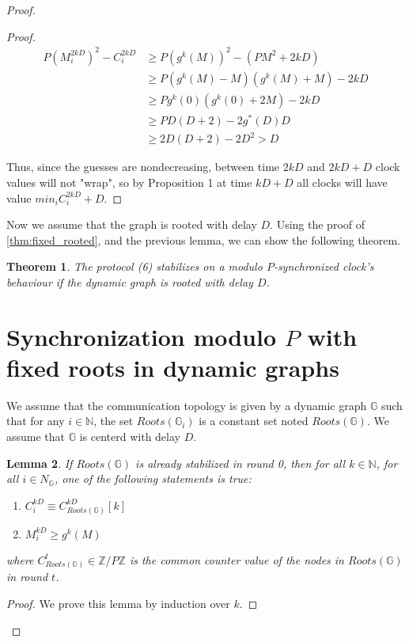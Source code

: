 \documentclass[11pt,letterpaper]{article}
\newtheorem{thm}{Theorem}
\newtheorem{lem}[thm]{Lemma}
\begin{document}
\begin{proof}
\begin{proof}
	\begin{align*}
		P(M_i^{2kD})^2 - C_i^{2kD} & \geq P(g^k(M))^2-(PM^2+2kD) \\
		& \geq P(g^k(M)-M)(g^k(M)+M)-2kD \\
		& \geq Pg^k(0)(g^k(0)+2M)-2kD \\
		& \geq PD(D+2)-2g^*(D)D \\
		& \geq 2D(D+2)-2D^2 > D
	\end{align*}

	Thus, since the guesses are nondecreasing, between time $2kD$
	and $2kD + D$ clock values will not "wrap", so by Proposition 1
	at time $kD + D$ all clocks will have value $min_i C_i^{2kD}+D$.
\end{proof}

Now we assume that the graph is rooted with delay $D$.
Using the proof of \ref{thm:fixed_rooted}, and the previous lemma, we can show the following theorem.

\begin{thm}
	The protocol (6) stabilizes on a modulo $P$-synchronized clock's behaviour if the dynamic graph is rooted with delay $D$.
\end{thm}

\section{Synchronization modulo $P$ with fixed roots in dynamic graphs}

We assume that the communication topology is given by a dynamic graph $\mathds{G}$
such that for any $i \in \mathds{N}$, the set $Roots(\mathds{G}_i)$ is a constant set noted $Roots(\mathds{G})$.
We assume that $\mathds{G}$ is centerd with delay $D$.

\begin{lem}
	If $Roots(\mathds{G})$ is already stabilized in round 0, then
	for all $k \in \mathds{N}$, for all $i \in N_\mathds{G}$,
	one of the following statements is true:
	\begin{enumerate}
		\item $C_i^{kD} \equiv C_{Roots(\mathds{G})}^{kD} [k]$
		\item $M_i^{kD} \geq g^{k}(M)$
	\end{enumerate}
	where $C_{Roots(\mathds{G})}^t \in \mathds{Z}/P\mathds{Z}$ is the common counter value of the nodes in $Roots(\mathds{G})$ in round $t$.
\end{lem}
\begin{proof}
	We prove this lemma by induction over $k$.


\end{proof}
\end{proof}
\end{document}
